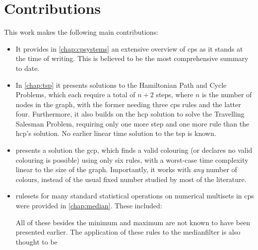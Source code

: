 
\section{Contributions}
This work makes the following main contributions:

\begin{itemize}
    \item It provides in \cref{chap:cpsystems} an extensive overview of \gls{cps} as it stands at the time of writing.  This is believed to be the most comprehensive summary to date.
    \item In \cref{chap:tsp} it presents solutions to the Hamiltonian Path and Cycle Problems, which each require a total of \(n + 2\) steps, where \(n\) is the number of nodes in the graph, with the former needing three \gls{cps} rules and the latter four.  Furthermore, it also builds on the \gls{hcp} solution to solve the Travelling Salesman Problem, requiring only one more step and one more rule than the \gls{hcp}'s solution.  No earlier linear time solution to the \gls{tsp} is known.
    \item {} presents a solution the \gls{gcp}, which finds a valid colouring (or declares no valid colouring is possible) using only six rules, with a worst-case time complexity linear to the size of the graph.  Importantly, it works with \emph{any} number of colours, instead of the usual fixed number studied by most of the literature.
    \item \Glspl{ruleset} for many standard statistical operations on numerical multisets in \gls{cps} were provided in \cref{chap:median}.  These included:
    All of these besides the minimum and maximum are not known to have been presented earlier.  The application of these rules to the \gls{medianfilter} is also thought to be 

\end{itemize}
